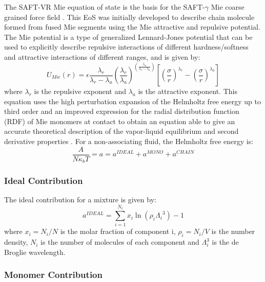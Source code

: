 The SAFT-VR Mie equation of state \cite{lafitte2013} is the basis for the SAFT-$\gamma$ Mie coarse grained force field \cite{avendano2011}. This EoS was initially developed to describe chain molecule formed from fused Mie segments using the Mie attractive and repulsive potential. The Mie potential is a type of generalized Lennard-Jones potential that can be used to explicitly describe repulsive interactions of different hardness/softness and attractive interactions of different ranges, and is given by:
\begin{equation}
U_{Mie}(r) = \epsilon\frac{\lambda_r}{\lambda_r - \lambda_a} \left(\frac{\lambda_r}{\lambda_a} \right)^{\left( \frac{\lambda_a}{\lambda_r - \lambda_a} \right)}
\left[ \left(\frac{\sigma}{r} \right)^{\lambda_r} - \left(\frac{\sigma}{r} \right)^{\lambda_a} \right]
\label{eqn:miepotential}
\end{equation}
where $\lambda_r$ is the repulsive exponent and $\lambda_a$ is the attractive exponent. This equation uses the  high perturbation expansion of the Helmholtz free energy up to third order and an improved expression for the  radial distribution function (RDF) of Mie monomers at contact to obtain an equation able to give an accurate theoretical description of the vapor-liquid equilibrium and second derivative properties \cite{lafitte2013}. For a non-associating fluid, the Helmholtz free energy is:
\begin{equation}
\frac{A}{N\kappa_{b}T} = a = a^{IDEAL} + a^{MONO} + a^{CHAIN}
\label{eqn:miehelm}
\end{equation}

\subsubsection{Ideal Contribution}

The ideal contribution for a mixture is given by:
\begin{equation}
a^{IDEAL} = \sum_{i=1}^{N_{c}} x_{i}\ln{(\rho_{i}{\Lambda_{i}}^3)} -1
\label{eqn:aideal}
\end{equation}
where $x_{i}=N_{i}/N$ is the molar fraction of component i, $\rho_{i}=N_{i}/V$ is the number density, $N_{i}$ is the number of molecules of each component and $\Lambda_{i}^3$ is the de Broglie wavelength. 

\subsubsection{Monomer Contribution}

